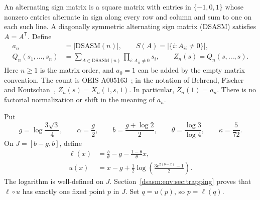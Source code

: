 \documentclass[11pt,letterpaper]{article}
\theoremstyle{remark}\newtheorem{remark}[theorem]{Remark}
\newcommand{\DS}{\mathrm{DSASM}}\newcommand{\ASM}{\mathrm{ASM}}
\begin{document}
An alternating sign matrix is a square matrix with entries in
$\{-1,0,1\}$ whose nonzero entries alternate in sign along every row
and column and sum to one on each such line. A diagonally symmetric
alternating sign matrix (DSASM) satisfies $A=A^{\mathsf T}$. Define
\begin{equation}\label{dsasm:env:def}
\begin{split}
 a_n&=|\DS(n)|,\qquad S(A)=|\{i:A_{ii}\ne0\}|,\\
 Q_n(s_1,\ldots,s_n)&=\sum_{A\in\DS(n)}\prod_{i:A_{ii}\ne0}s_i,
 \qquad Z_n(s)=Q_n(s,\ldots,s).
\end{split}
\end{equation}
Here $n\ge1$ is the matrix order, and $a_0=1$ can be added by the empty
matrix convention. The count is OEIS A005163~\cite{oeis}; in the
notation of Behrend, Fischer and Koutschan~\cite{bfk},
$Z_n(s)=X_n(1,s,1)$. In particular, $Z_n(1)=a_n$.
There is no factorial normalization or shift in the meaning of $a_n$.

Put
\begin{equation}\label{dsasm:env:constants}
 g=\log\frac{3\sqrt3}{4},\qquad \alpha=\frac g2,\qquad
 b=\frac{g+\log2}{2},\qquad
 \theta=\frac{\log3}{\log4},\qquad \kappa=\frac5{72}.
\end{equation}
On $J=[b-g,b]$, define
\begin{equation}\label{dsasm:env:maps}
\begin{split}
 \ell(x)&=\frac b\theta-g-\frac{1-\theta}{\theta}x,\\
 u(x)&=x-g+\frac12\log\!\left(\frac{3e^{2(b-x)}-1}{2}\right).
\end{split}
\end{equation}
The logarithm is well-defined on $J$. Section~\ref{dsasm:env:sec:trapping}
proves that $\ell\circ u$ has exactly one fixed point $p$ in $J$.
Set $q=u(p)$, so $p=\ell(q)$.
\end{document}
